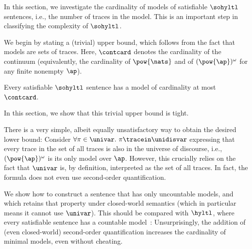 In this section, we investigate the cardinality of models of satisfiable $\sohyltl$ sentences, i.e., the number of traces in the model.
This is an important step in classifying the complexity of $\sohyltl$.

We begin by stating a (trivial) upper bound, which follows from the fact that models are sets of traces.
Here, $\contcard$ denotes the cardinality of the continuum (equivalently, the cardinality of $\pow{\nats}$ and of $(\pow{\ap})^\omega$ for any finite nonempty $\ap$). 

\begin{prop}
    Every satisfiable $\sohyltl$ sentence has a model of cardinality at most~$\contcard$.
\end{prop}

In this section, we show that this trivial upper bound is tight. 

\begin{rem}
\label{remark_unsatisfactory}
There is a very simple, albeit equally unsatisfactory way to obtain the desired lower bound: 
Consider $\forall \pi \in \univar.\ \pi\tracein\unidisvar$ expressing that every trace in the set of all traces is also in the universe of discourse, i.e., $(\pow{\ap})^\omega$ is its only model over $\ap$. 
However, this crucially relies on the fact that $\univar$ is, by definition, interpreted as the set of all traces.
In fact, the formula does not even use second-order quantification.
\end{rem}

We show how to construct a sentence that has only uncountable models, and which retains that property under closed-world semantics (which in particular means it cannot use $\univar$). 
This should be compared with $\hyltl$, where every satisfiable sentence has a countable model~\cite{FZ17}: 
Unsurprisingly, the addition of (even closed-world) second-order quantification increases the cardinality of minimal models, even without cheating.

